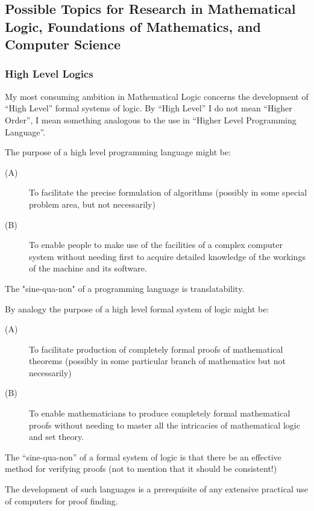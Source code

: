 \documentclass[10pt,titlepage]{book}
\begin{document}
\subsection[Possible Topics for Research]{Possible Topics for Research in Mathematical Logic, Foundations of Mathematics, and Computer Science}

\subsubsection{High Level Logics}

My most consuming ambition in Mathematical Logic concerns the development of ``High Level'' formal systems of logic. By ``High Level'' I do not mean ``Higher Order'', I mean something analogous to the use in ``Higher Level Programming Language''.

The purpose of a high level programming language might be:

\begin{description}
\item[(A)]	To facilitate the precise formulation of algorithms (possibly in some special problem area, but not necessarily)
\item[(B)]	To enable people to make use of the facilities of a complex computer system without needing first to acquire detailed knowledge of the workings of the machine and its software.
\end{description}

The "sine-qua-non" of a programming language is translatability.

By analogy the purpose of a high level formal system of logic might be:
\begin{description}
\item[(A)]	To facilitate production of completely formal proofs of mathematical theorems (possibly in some particular branch of mathematics but not necessarily)
\item[(B)]	To enable mathematicians to produce completely formal mathematical proofs without needing to master all the intricacies of mathematical logic and set theory.
\end{description}

The ``sine-qua-non'' of a formal system of logic is that there be an effective method for verifying proofs (not to mention that it should be consistent!)

The development of such languages is a prerequisite of any extensive practical use of computers for proof finding.
\end{document}
